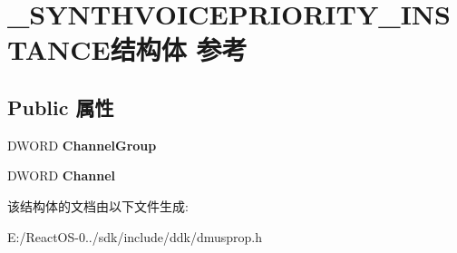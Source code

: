 \hypertarget{struct___s_y_n_t_h_v_o_i_c_e_p_r_i_o_r_i_t_y___i_n_s_t_a_n_c_e}{}\section{\+\_\+\+S\+Y\+N\+T\+H\+V\+O\+I\+C\+E\+P\+R\+I\+O\+R\+I\+T\+Y\+\_\+\+I\+N\+S\+T\+A\+N\+C\+E结构体 参考}
\label{struct___s_y_n_t_h_v_o_i_c_e_p_r_i_o_r_i_t_y___i_n_s_t_a_n_c_e}
\subsection*{Public 属性}
\begin{DoxyCompactItemize}
\item 
\mbox{\label{struct___s_y_n_t_h_v_o_i_c_e_p_r_i_o_r_i_t_y___i_n_s_t_a_n_c_e_abe254b6e68462fdad462cd27708314fd}} 
D\+W\+O\+RD {\bfseries Channel\+Group}
\item 
\mbox{\label{struct___s_y_n_t_h_v_o_i_c_e_p_r_i_o_r_i_t_y___i_n_s_t_a_n_c_e_a78e1721015a23fb1b05ccbf1a09558b9}} 
D\+W\+O\+RD {\bfseries Channel}
\end{DoxyCompactItemize}


该结构体的文档由以下文件生成\+:\begin{DoxyCompactItemize}
\item 
E\+:/\+React\+O\+S-\/0../sdk/include/ddk/dmusprop.\+h\end{DoxyCompactItemize}
